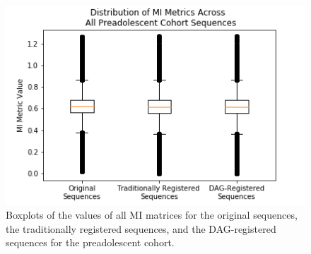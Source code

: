 \begin{figure}
\centering
\includegraphics[height=0.3\textheight]{6/figures/preads-mi-box.png}
\caption{Boxplots of the values of all MI matrices for the original sequences, the traditionally registered sequences, and the DAG-registered sequences for the preadolescent cohort.}
\label{fig:preads-mi-box}
\end{figure}

